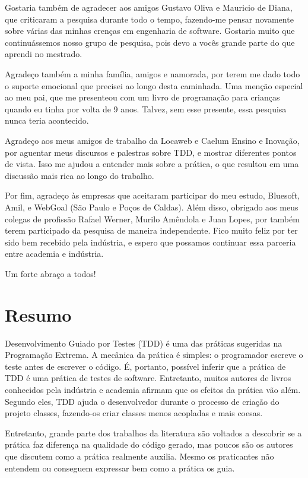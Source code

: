 \documentclass[11pt,openany,twoside,a4paper]{book}
\begin{document}
Gostaria também de agradecer aos amigos Gustavo Oliva e Mauricio de Diana, que
criticaram a pesquisa durante todo o tempo, fazendo-me pensar novamente sobre
várias das minhas crenças em engenharia de software. Gostaria muito que continuássemos
nosso grupo de pesquisa, pois devo a vocês grande parte do que aprendi no mestrado.

Agradeço também a minha família, amigos e namorada, por terem me dado todo o suporte
emocional que precisei ao longo desta caminhada. Uma menção especial ao meu pai,
que me presenteou com um livro de programação para crianças quando eu tinha por volta
de 9 anos. Talvez, sem esse presente, essa pesquisa nunca teria acontecido.

Agradeço aos meus amigos de trabalho da Locaweb e Caelum Ensino e Inovação, 
por aguentar meus discursos e palestras sobre TDD, e mostrar diferentes
pontos de vista. Isso me ajudou a entender mais sobre a prática, o que resultou
em uma discussão mais rica ao longo do trabalho.

Por fim, agradeço às empresas que aceitaram participar do meu estudo, Bluesoft,
Amil, e WebGoal (São Paulo e Poços de Caldas). Além disso, obrigado aos meus colegas
de profissão Rafael Werner, Murilo Amêndola e Juan Lopes, por também terem
participado da pesquisa de maneira independente. Fico muito feliz por ter sido
bem recebido pela indústria, e espero que possamos continuar essa parceria entre
academia e indústria.

Um forte abraço a todos!

\chapter*{Resumo}

Desenvolvimento Guiado por Testes (TDD) é uma das práticas sugeridas na Programação
Extrema. A mecânica da prática é simples: o programador escreve o teste antes
de escrever o código. É, portanto, possível inferir que a prática de TDD é uma
prática de testes de software. Entretanto, muitos autores de livros 
conhecidos pela indústria e academia
afirmam que os efeitos da prática vão além. Segundo eles,
TDD ajuda o desenvolvedor durante o processo de criação do projeto classes,
fazendo-os criar classes menos acopladas e mais coesas.

Entretanto, grande parte dos trabalhos da literatura são voltados a descobrir se
a prática faz diferença na qualidade do código gerado, mas poucos são os 
autores que discutem como a prática realmente auxilia.
Mesmo os praticantes não entendem ou conseguem expressar bem como a prática
os guia.
\end{document}
